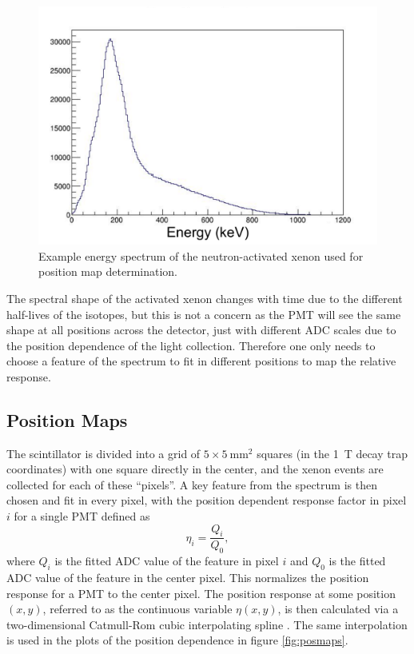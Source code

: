 \begin{figure}[h] 
\centering
\includegraphics[scale=.5]{3-UCNAAnalysis/xenonSpectrum.pdf}
\caption{Example energy spectrum of the neutron-activated xenon used for position map determination. }
\label{fig:xenonSpectrum}
\end{figure}

The spectral shape of the activated xenon changes with time due to the different half-lives
of the isotopes, but this is not a concern as the PMT will see the same shape at all positions
across the detector, just with different ADC scales due to the position dependence of the light
collection. Therefore one only needs to choose a feature of the spectrum to fit in different
positions to map the relative response.

\subsection{Position Maps}

The scintillator is divided into a grid of $5\times5\mathrm{~mm}^2$ squares (in the 1~T
decay trap coordinates) with one square directly in the center,
and the xenon events are collected for each of these ``pixels''. A key feature
from the spectrum is then chosen and fit in every pixel, with the position dependent response
factor in pixel $i$ for a single PMT defined as
%
\begin{equation}
  \eta_i = \frac{Q_i}{Q_0},
\end{equation}
%
where $Q_i$ is the fitted ADC value of the feature in pixel $i$ and $Q_0$ is the fitted ADC value of the
feature in the center pixel. This normalizes the position response for a PMT to the center pixel. The
position response at some position $(x,y)$, referred to as the continuous variable $\eta(x,y)$,
is then calculated via a two-dimensional Catmull-Rom
cubic interpolating spline \cite{catmull1974}. The same interpolation is used in the plots of the
position dependence in figure \ref{fig:posmaps}.



